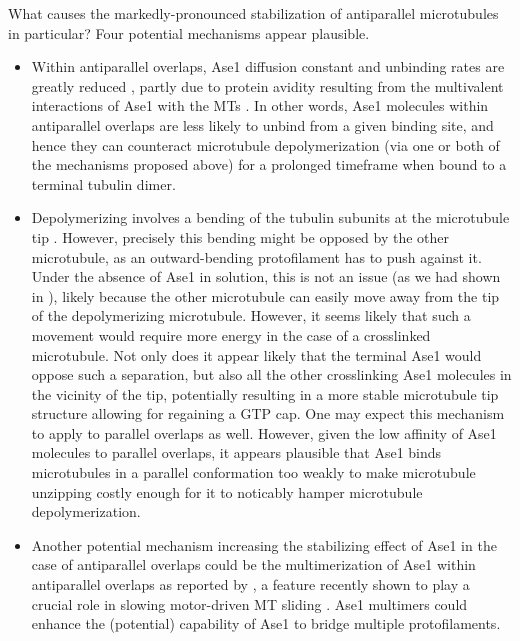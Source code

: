 \par
What causes the markedly-pronounced stabilization of antiparallel microtubules in particular? Four potential mechanisms appear plausible.

\begin{itemize}
    \item Within antiparallel overlaps, Ase1 diffusion constant and unbinding rates are greatly reduced \parencite{Kapitein2008, lanskydiffusible2015}, partly due to protein avidity resulting from the multivalent interactions of Ase1 with the MTs \parencite{braun2020cytoskeletal, erlendsson2021binding}. In other words, Ase1 molecules within antiparallel overlaps are less likely to unbind from a given binding site, and hence they can counteract microtubule depolymerization (via one or both of the mechanisms proposed above) for a prolonged timeframe when bound to a terminal tubulin dimer.
    \item Depolymerizing involves a bending of the tubulin subunits at the microtubule tip . However, precisely this bending might be opposed by the other microtubule, as an outward-bending protofilament has to push against it. Under the absence of Ase1 in solution, this is not an issue (as we had shown in ), likely because the other microtubule can easily move away from the tip of the depolymerizing microtubule. However, it seems likely that such a movement would require more energy in the case of a crosslinked microtubule. Not only does it appear likely that the terminal Ase1 would oppose such a separation, but also all the other crosslinking Ase1 molecules in the vicinity of the tip, potentially resulting in a more stable microtubule tip structure allowing for regaining a GTP cap. One may expect this mechanism to apply to parallel overlaps as well. However, given the low affinity of Ase1 molecules to parallel overlaps, it appears plausible that Ase1 binds microtubules in a parallel conformation too weakly to make microtubule unzipping costly enough for it to noticably hamper microtubule depolymerization.
    \item Another potential mechanism increasing the stabilizing effect of Ase1 in the case of antiparallel overlaps could be the multimerization of Ase1 within antiparallel overlaps as reported by \cite{Kapitein2008}, a feature recently shown to play a crucial role in slowing motor-driven MT sliding \parencite{alfieri2021two}. Ase1 multimers could enhance the (potential) capability of Ase1 to bridge multiple protofilaments.

\end{itemize}
